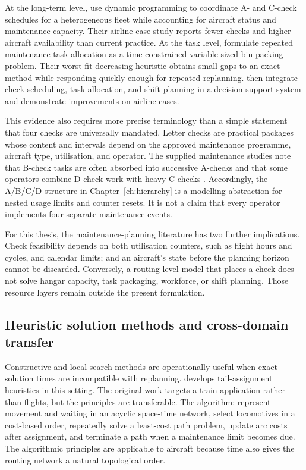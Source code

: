 At the long-term level, \citet{deng2020maintenance} use dynamic programming to
coordinate A- and C-check schedules for a heterogeneous fleet while accounting
for aircraft status and maintenance capacity. Their airline case study reports
fewer checks and higher aircraft availability than current practice. At the
task level, \citet{witteman2021binpacking} formulate repeated maintenance-task
allocation as a time-constrained variable-sized bin-packing problem. Their
worst-fit-decreasing heuristic obtains small gaps to an exact method while
responding quickly enough for repeated replanning. \citet{deng2021dss} then
integrate check scheduling, task allocation, and shift planning in a decision
support system and demonstrate improvements on airline cases.

This evidence also requires more precise terminology than a simple statement
that four checks are universally mandated. Letter checks are practical packages
whose content and intervals depend on the approved maintenance programme,
aircraft type, utilisation, and operator. The supplied maintenance studies note
that B-check tasks are often absorbed into successive A-checks and that some
operators combine D-check work with heavy C-checks
\citep{deng2020maintenance, witteman2021binpacking, deng2021dss}. Accordingly,
the A/B/C/D structure in Chapter~\ref{ch:hierarchy} is a modelling abstraction
for nested usage limits and counter resets. It is not a claim that every
operator implements four separate maintenance events.

For this thesis, the maintenance-planning literature has two further
implications. Check feasibility depends on both utilisation counters, such as
flight hours and cycles, and calendar limits; and an aircraft's state before the
planning horizon cannot be discarded. Conversely, a routing-level model that
places a check does not solve hangar capacity, task packaging, workforce, or
shift planning. Those resource layers remain outside the present formulation.


\subsection{Heuristic solution methods and cross-domain transfer}

Constructive and local-search methods are operationally useful when exact
solution times are incompatible with replanning. \citet{gronkvist2005tail}
develops tail-assignment heuristics in this setting. 
The original work targets a train application rather than flights, but the principles are transferable. The algorithm:
represent movement and waiting in an acyclic space-time network, select locomotives in a
cost-based order, repeatedly solve a least-cost path problem, update arc costs
after assignment, and terminate a path when a maintenance limit becomes due. The algorithmic principles
are applicable to aircraft because time also gives the routing network a natural
topological order.


